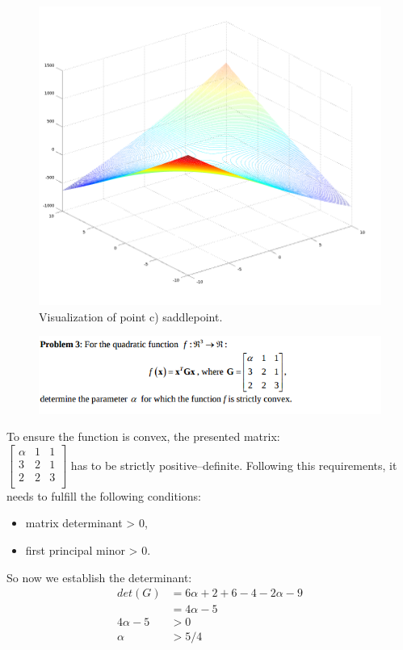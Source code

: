 \documentclass[eng,openany]{mgr}
\begin{document}
\begin{figure}[h]
\centering
\includegraphics[width=0.7\linewidth]{screenshot010}
\caption{Visualization of point c) saddlepoint.}
\label{fig:screenshot010}
\end{figure}

\clearpage
\begin{figure}[h]
\centering
\includegraphics[width=0.7\linewidth]{screenshot011}
\label{fig:screenshot011}
\end{figure}

To ensure the function is convex, the presented matrix:\\
\begin{math}
\begin{bmatrix}
\alpha & 1 & 1\\
3& 2& 1\\
2& 2& 3\\
\end{bmatrix}
\end{math}
has to be strictly positive--definite.
Following this requirements, it needs to fulfill the following conditions:
\begin{itemize}
	\item matrix determinant > 0,
	\item first principal minor > 0.
\end{itemize}
So now we establish the determinant:\\
\begin{align*}
det(G) &= 6\alpha + 2 + 6 -4 - 2\alpha - 9\\
 &= 4 \alpha - 5
 \\
 4\alpha -5 &> 0\\
 \alpha &> 5/4
\end{align*}
\end{document}
